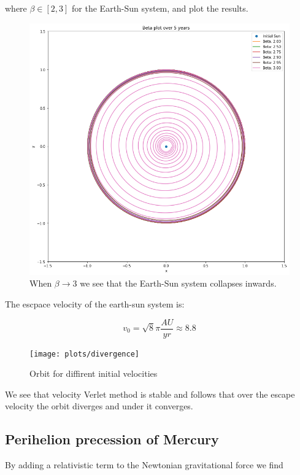 \documentclass[a4paper, fontsize=11pt]{article}
\begin{document}
where $\beta \in [2,3]$ for the Earth-Sun system, and plot the results.

\begin{figure}[H]
\includegraphics[scale=0.45]{plots/beta}
\caption{When $\beta \rightarrow 3$ we see that the Earth-Sun system collapses inwards.}
\label{fig:Beta}
\end{figure}

The escpace velocity of the earth-sun system is:

\begin{equation}
v_0 = \sqrt{8} \pi \frac{AU}{yr} \approx 8.8
\end{equation}

\begin{figure}[H]
\texttt{[image: plots/divergence]}
\caption{Orbit for diffirent initial velocities}
\label{fig:Euler}
\end{figure}

We see that velocity Verlet method is stable and follows that over the escape velocity the orbit diverges and under it converges.



\subsection{Perihelion precession of Mercury}

By adding a relativistic term to the Newtonian gravitational force we find
\end{document}
